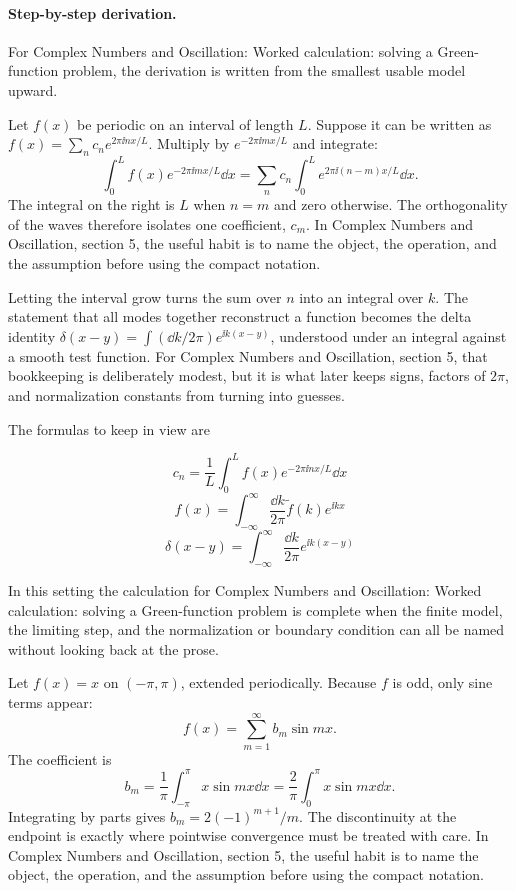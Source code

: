 \paragraph{Step-by-step derivation.}

For Complex Numbers and Oscillation: Worked calculation: solving a Green-function problem, the derivation is written from the smallest usable model upward.

Let \(f(x)\) be periodic on an interval of length \(L\).  Suppose it can be written as \(f(x)=\sum_n c_ne^{2\pi\ii nx/L}\).  Multiply by \(e^{-2\pi\ii mx/L}\) and integrate:
\[
  \int_0^L f(x)e^{-2\pi\ii mx/L}\dd x
  =
  \sum_n c_n\int_0^L e^{2\pi\ii(n-m)x/L}\dd x.
\]
The integral on the right is \(L\) when \(n=m\) and zero otherwise.  The orthogonality of the waves therefore isolates one coefficient, \(c_m\).  In Complex Numbers and Oscillation, section 5, the useful habit is to name the object, the operation, and the assumption before using the compact notation.

Letting the interval grow turns the sum over \(n\) into an integral over \(k\).  The statement that all modes together reconstruct a function becomes the delta identity \(\delta(x-y)=\int(\dd k/2\pi)e^{\ii k(x-y)}\), understood under an integral against a smooth test function.  For Complex Numbers and Oscillation, section 5, that bookkeeping is deliberately modest, but it is what later keeps signs, factors of \(2\pi\), and normalization constants from turning into guesses.

The formulas to keep in view are

\[
  c_n=\frac1L\int_0^L f(x)e^{-2\pi\ii nx/L}\dd x
\]
\[
  f(x)=\int_{-\infty}^{\infty}\frac{\dd k}{2\pi}\tilde f(k)e^{\ii kx}
\]
\[
  \delta(x-y)=\int_{-\infty}^{\infty}\frac{\dd k}{2\pi}e^{\ii k(x-y)}
\]

In this setting the calculation for Complex Numbers and Oscillation: Worked calculation: solving a Green-function problem is complete when the finite model, the limiting step, and the normalization or boundary condition can all be named without looking back at the prose.




\begin{example}
Let \(f(x)=x\) on \((-\pi,\pi)\), extended periodically.  Because \(f\) is odd, only sine terms appear:
\[
  f(x)=\sum_{m=1}^\infty b_m\sin mx.
\]
The coefficient is
\[
  b_m=\frac1\pi\int_{-\pi}^\pi x\sin mx\dd x
  =\frac2\pi\int_0^\pi x\sin mx\dd x.
\]
Integrating by parts gives \(b_m=2(-1)^{m+1}/m\).  The discontinuity at the endpoint is exactly where pointwise convergence must be treated with care.  In Complex Numbers and Oscillation, section 5, the useful habit is to name the object, the operation, and the assumption before using the compact notation.
\end{example}



